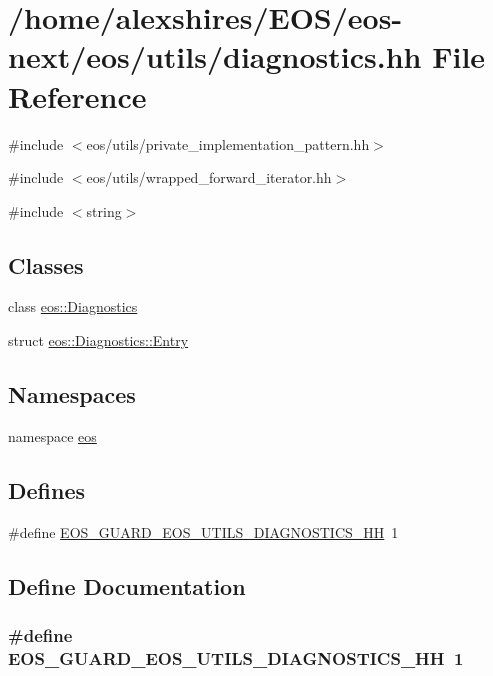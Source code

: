 \hypertarget{diagnostics_8hh}{
\section{/home/alexshires/EOS/eos-\/next/eos/utils/diagnostics.hh File Reference}
\label{diagnostics_8hh}
}
{\ttfamily \#include $<$eos/utils/private\_\-implementation\_\-pattern.hh$>$}\par
{\ttfamily \#include $<$eos/utils/wrapped\_\-forward\_\-iterator.hh$>$}\par
{\ttfamily \#include $<$string$>$}\par
\subsection*{Classes}
\begin{DoxyCompactItemize}
\item 
class \hyperlink{classeos_1_1Diagnostics}{eos::Diagnostics}
\item 
struct \hyperlink{structeos_1_1Diagnostics_1_1Entry}{eos::Diagnostics::Entry}
\end{DoxyCompactItemize}
\subsection*{Namespaces}
\begin{DoxyCompactItemize}
\item 
namespace \hyperlink{namespaceeos}{eos}
\end{DoxyCompactItemize}
\subsection*{Defines}
\begin{DoxyCompactItemize}
\item 
\#define \hyperlink{diagnostics_8hh_ad3a277bda2d0cfec14d99b448eca7fd6}{EOS\_\-GUARD\_\-EOS\_\-UTILS\_\-DIAGNOSTICS\_\-HH}~1
\end{DoxyCompactItemize}


\subsection{Define Documentation}
\hypertarget{diagnostics_8hh_ad3a277bda2d0cfec14d99b448eca7fd6}{
\subsubsection[{EOS\_\-GUARD\_\-EOS\_\-UTILS\_\-DIAGNOSTICS\_\-HH}]{\setlength{\rightskip}{0pt plus 5cm}\#define EOS\_\-GUARD\_\-EOS\_\-UTILS\_\-DIAGNOSTICS\_\-HH~1}}
\label{diagnostics_8hh_ad3a277bda2d0cfec14d99b448eca7fd6}
